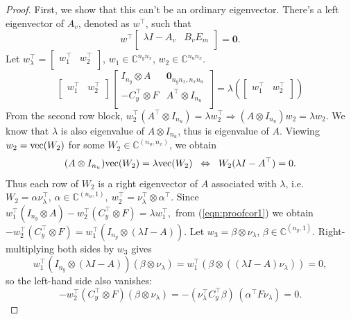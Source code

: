 \begin{proof}
First, we show that this can't be an ordinary eigenvector. 
There's a left eigenvector of \(A_v\), denoted as \(w^\top\), such that 
\[
w^\top 
\left[\begin{array}{cc}
    \lambda I - A_v & B_v E_m \\ 
\end{array}  \right] =\mathbf{0}.
\]
Let \(w_\lambda^\top= \left[\begin{array}{cc}
    w_1^\top & w_2^\top\\
\end{array}\right]\), \(w_1\in\mathbb{C}^{n_y n_x}\), \(w_2\in\mathbb{C}^{n_u n_x}\).
\begin{equation}\label{eqn:proofcor1}
\left[
\begin{array}{cc}
    w_1^\top & w_2^\top \\
\end{array}\right]
\left[
\begin{array}{cc}
    I_{n_y}\otimes A & \mathbf{0}_{n_y n_x,n_x n_u}\\
   -C_y^\top \otimes F & A^\top\otimes I_{n_u}\\
\end{array}\right] = \lambda(\left[
\begin{array}{cc}
    w_1^\top & w_2^\top \\
\end{array}\right])
\end{equation}
From the second row block,  \(w_2^\top (A^\top \otimes I_{n_u}) = \lambda w_2^\top
\Rightarrow (A \otimes I_{n_u}) w_2 = \lambda w_2\).
We know that \(\lambda\) is also eigenvalue of \(A\otimes I_{n_u}\), thus is eigenvalue of \(A\).
Viewing \(w_2 = {\mathrm{vec}}(W_2)\) for some \(W_2\in\mathbb{C}^{(n_u,n_x)}\), we obtain
\[
(A\otimes I_{n_u}){\mathrm{vec}}(W_2) = \lambda {\mathrm{vec}}(W_2)
\;\;\Leftrightarrow\;\;
W_2(\lambda I - A^\top) = 0.
\]
Thus each row of \(W_2\) is a right eigenvector of \(A\) associated with \(\lambda\), i.e. \(W_2 = \alpha \nu_\lambda^\top,\, \alpha \in \mathbb{C}^{(n_u,1)},\ 
w_2^\top = \nu_\lambda^\top \otimes \alpha^\top\).
Since \(w_1^\top (I_{n_y}\otimes A) - w_2^\top (C_y^\top \otimes F) = \lambda w_1^\top,\) from (\ref{eqn:proofcor1})
we obtain \(- w_2^\top (C_y^\top \otimes F) = w_1^\top (I_{n_y}\otimes (\lambda I-A))
\).
Let \(w_3 = \beta \otimes \nu_\lambda\), \(\beta\in \mathbb{C}^{(n_y,1)}\). Right-multiplying both sides by \(w_3\) gives
\[
w_1^\top (I_{n_y}\otimes (\lambda I-A))(\beta \otimes \nu_\lambda) 
= w_1^\top (\beta \otimes ((\lambda I-A)\nu_\lambda)) = 0,
\]
so the left-hand side also vanishes:
\[
- w_2^\top (C_y^\top \otimes F)(\beta \otimes \nu_\lambda) 
= - (\nu_\lambda^\top C_y^\top \beta)\, (\alpha^\top F \nu_\lambda) = 0.
\]


\end{proof}
